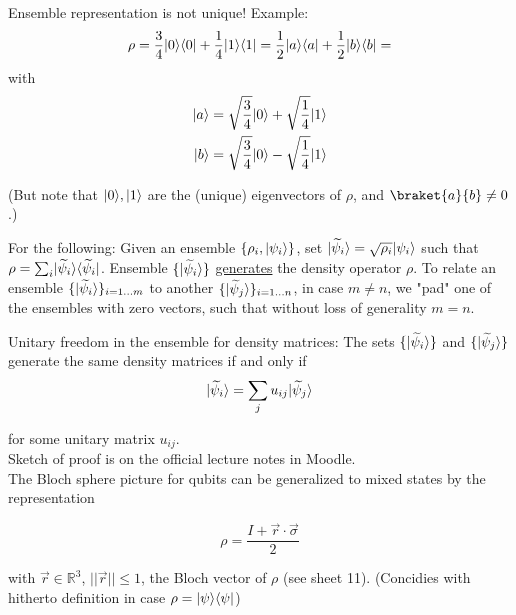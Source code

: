 Ensemble representation is not unique! Example:
\begin{equation*}
    \rho = \frac{3}{4} \lvert0\rangle \langle0\rvert + \frac{1}{4} \lvert1\rangle\langle1\rvert 
    = \frac{1}{2} \lvert a\rangle \langle a\rvert + \frac{1}{2} \lvert b\rangle\langle b\rvert = 
\end{equation*}
with 
\begin{align*}
    \lvert a\rangle &= \sqrt{\frac{3}{4}} \lvert0\rangle + \sqrt{\frac{1}{4}} \lvert1\rangle \\
    \lvert b\rangle &= \sqrt{\frac{3}{4}} \lvert0\rangle - \sqrt{\frac{1}{4}} \lvert1\rangle \\
\end{align*}

(But note that $\lvert0\rangle, \lvert1\rangle$ are the (unique) eigenvectors of $\rho$, 
and $\braket{a}{b} \neq 0$.)
\newline

For the following: Given an ensemble $\{ \rho_i, \lvert\psi_i\rangle \}$, set
$\lvert\widetilde{\psi}_i\rangle = \sqrt{\rho_i} \lvert\psi_i\rangle$ such that 
$\rho = \sum_i \lvert\widetilde{\psi}_i\rangle \langle\widetilde{\psi}_i\rvert$.
Ensemble $\{ \lvert\widetilde{\psi}_i\rangle \}$ \underline{generates} the density operator $\rho$.
To relate an ensemble $\{ \lvert\widetilde{\psi}_i\rangle \}_{i=1...m}$ to another
$\{ \lvert\widetilde{\psi}_j\rangle \}_{i=1...n}$, in case $m \neq n$, we "pad" one of the ensembles 
with zero vectors, such that without loss of generality $m = n$.
\newline

Unitary freedom in the ensemble for density matrices: The sets
$\{\lvert\widetilde{\psi}_i\rangle\}$ and $\{\lvert\widetilde{\psi}_j\rangle\}$ generate the same 
density matrices if and only if 
\begin{equation}
    \lvert\widetilde{\psi}_i\rangle = \sum_j u_{ij} \lvert\widetilde{\psi}_j\rangle
\end{equation}

for some unitary matrix $u_{ij}$. \\
Sketch of proof is on the official lecture notes in Moodle.
\\

The Bloch sphere picture for qubits can be generalized to mixed states by the representation

\begin{equation}
   \rho = \frac{I + \vec{r} \cdot \vec{\sigma}}{2} 
\end{equation}

with $\vec{r} \in \mathbb{R}^3$, $||\vec{r}|| \leq 1$, the Bloch vector of $\rho$ (see sheet 11).
(Concidies with hitherto definition in case $\rho = \lvert\psi\rangle \langle\psi\rvert$) 



